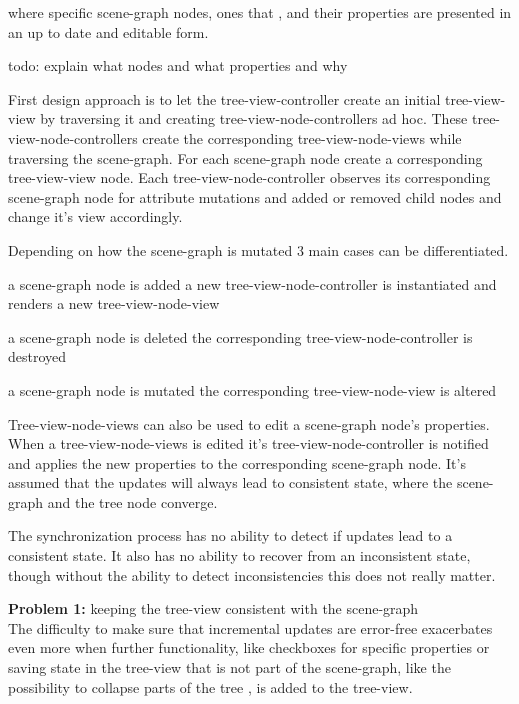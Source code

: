where specific scene-graph nodes, ones that , and their properties are
presented in an up to date and editable form.

todo: explain what nodes and what properties and why

First design approach is to let the tree-view-controller create an
initial tree-view-view by traversing it and creating
tree-view-node-controllers ad hoc. These tree-view-node-controllers
create the corresponding tree-view-node-views while traversing the
scene-graph. For each scene-graph node create a corresponding
tree-view-view node. Each tree-view-node-controller observes its
corresponding scene-graph node for attribute mutations and added or
removed child nodes and change it's view accordingly.

Depending on how the scene-graph is mutated 3 main cases can be
differentiated.

\begin{description*}
  \item[a scene-graph node is added]
    a new tree-view-node-controller is instantiated and renders a new tree-view-node-view
  \item[a scene-graph node is deleted]
    the corresponding tree-view-node-controller is destroyed
  \item[a scene-graph node is mutated]
    the corresponding tree-view-node-view is altered
\end{description*}

Tree-view-node-views can also be used to edit a scene-graph node's
properties.\\
When a tree-view-node-views is edited it's tree-view-node-controller is
notified and applies the new properties to the corresponding scene-graph
node. It's assumed that the updates will always lead to consistent
state, where the scene-graph and the tree node converge.

The synchronization process has no ability to detect if updates lead to
a consistent state. It also has no ability to recover from an
inconsistent state, though without the ability to detect inconsistencies
this does not really matter.

\textbf{Problem 1:} keeping the tree-view consistent with the
scene-graph\\
The difficulty to make sure that incremental updates are error-free
exacerbates even more when further functionality, like checkboxes for
specific properties or saving state in the tree-view that is not part of
the scene-graph, like the possibility to collapse parts of the tree , is
added to the tree-view.

